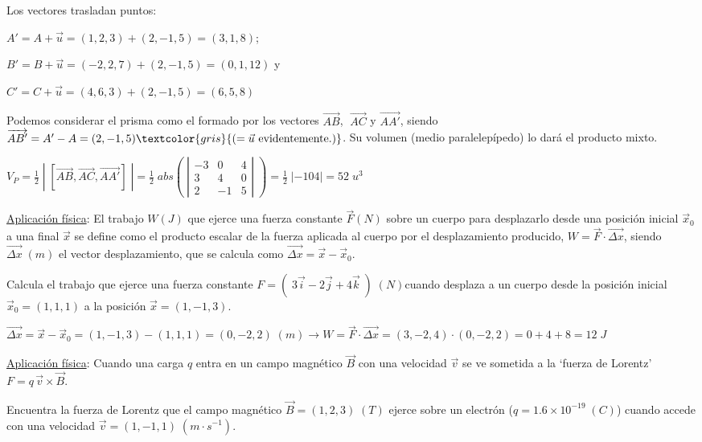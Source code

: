 \begin{proofw}
\begin{multicols}{2}
Los vectores trasladan puntos:

$A'=A+\vec u =(1,2,3)+(2,-1,5)=(3, 1, 8)$; 

$B'=B+\vec u=(-2,2,7)+(2,-1,5)=(0,1,12)$ y 

$C'=C+\vec u=(4,6,3)+(2,-1,5)=(6,5,8)$
\end{multicols}
Podemos considerar el prisma como el formado por los vectores  $\overrightarrow {AB}$, $\; \overrightarrow {AC}$ y $\overrightarrow {AA'}$, siendo $\overrightarrow {AB'}=A'-A=(2,-1,5) \textcolor{gris}{(=\vec u \text{ evidentemente.)}}$. Su volumen (medio paralelepípedo) lo dará el producto mixto.

\noindent $V_P=$\small{$\frac 1 2\;|\;[\overrightarrow {AB}, \overrightarrow {AC},\overrightarrow {AA'}]\;|=\frac 1 2 \; abs \left(\; \left| \begin{matrix} -3&0&4\\3&4&0\\2&-1&5 \end{matrix} \right| \;\right)$}\normalsize{$=$}$\frac 1 2 \; |-104|=52 \; u^3$
\end{proofw}

\begin{ejre}
	\underline{Aplicación física}: El trabajo $W(J)$ que ejerce una fuerza  constante $\vec F(N)$ sobre un cuerpo para desplazarlo desde una posición inicial $\vec x_0$ a una final $\vec x$ se define como el producto escalar de la fuerza aplicada al cuerpo por el desplazamiento producido,  $W=\vec F \cdot \overrightarrow {\Delta x}$, siendo $\overrightarrow{\Delta x} \; (m)$ el vector desplazamiento, que se calcula como  $\overrightarrow{\Delta x}=\vec x - \vec x_0$.
	
	Calcula el trabajo que ejerce una fuerza constante $F=(\; 3\vec i - 2 \vec j + 4 \vec k \;) \; (N)$cuando desplaza a un cuerpo desde la posición inicial $\vec x_0=(1,1,1) $ a la posición $\vec x=(1,-1,3)$.
\end{ejre}

\begin{proofw}\renewcommand{\qedsymbol}{$\diamond$}
	 $\overrightarrow{\Delta x}=\vec x-\vec x_0=(1,-1,3)-(1,1,1)=(0,-2,2) \; (m) \to W=\vec F \cdot \overrightarrow {\Delta x}=(3,-2,4)\cdot (0,-2,2)=0+4+8=12\; J$
\end{proofw}

\begin{ejre}
	\underline{Aplicación física}: Cuando una carga $q$ entra en un campo magnético $\vec B$ con una velocidad $\vec v$ se ve sometida a la `fuerza de Lorentz' $F=q\, \vec v \times \vec B$.  
	
	Encuentra la fuerza de Lorentz que el campo magnético $\vec B=(1,2,3)\; (T)$ ejerce sobre un electrón ($q=1.6 \times 10^{-19} \; (C)$) cuando accede con una velocidad $\vec v=(1,-1,1)\; (m\cdot s^{-1})$.
\end{ejre}

